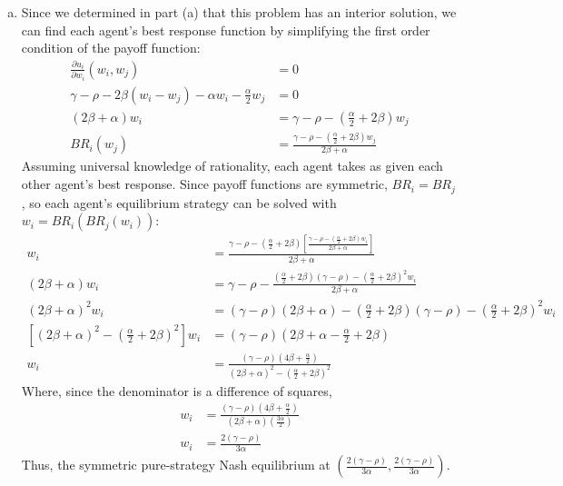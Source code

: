 \documentclass{article}
\begin{document}
\begin{enumerate}[(a)]
	\item Since we determined in part (a) that this problem has an interior solution, we can find each agent's best response function by simplifying the first order condition of the payoff function:
		\begin{align*}
			\frac{\partial u_i}{\partial w_i}(w_i,w_j) &= 0						\\
			\gamma-\rho-2\beta(w_i-w_j)-\alpha w_i - \frac{\alpha}{2}w_j &= 0	\\
			(2\beta+\alpha)w_i &= \gamma-\rho- \left(\frac{\alpha}{2} + 2\beta\right) w_j	\\
			BR_i(w_j) &= \frac{\gamma-\rho- \left(\frac{\alpha}{2} + 2\beta\right)w_j}{2\beta+\alpha}
		\end{align*}
		Assuming universal knowledge of rationality, each agent takes as given each other agent's best response. Since payoff functions are symmetric, ${BR_i=BR_j}$, so each agent's equilibrium strategy can be solved with ${w_i = BR_i\left(BR_j(w_i)\right)}$:
		\begin{align*}
			w_i &= \frac{ \gamma-\rho- \left(\frac{\alpha}{2} + 2\beta\right)\left[\frac{ \gamma-\rho- \left(\frac{\alpha}{2}+ 2\beta\right)w_i}{2\beta+\alpha}\right]}{2\beta+\alpha} \\
			(2\beta+\alpha)w_i &= \gamma-\rho-\frac{ \left(\frac{\alpha}{2} + 2\beta\right)(\gamma-\rho)- \left(\frac{\alpha}{2} + 2\beta\right)^2w_i}{2\beta+\alpha}	\\
			(2\beta+\alpha)^2w_i &= (\gamma-\rho)(2\beta+\alpha)-\left(\frac{\alpha}{2} + 2\beta\right)(\gamma-\rho)- \left(\frac{\alpha}{2} + 2\beta\right)^2w_i	\\
			\left[(2\beta+\alpha)^2- \left(\frac{\alpha}{2} + 2\beta\right)^2\right]w_i &= (\gamma-\rho)\left(2\beta+\alpha-\frac{\alpha}{2} + 2\beta\right)	\\
			w_i &= \frac{(\gamma-\rho)\left(4\beta+\frac{\alpha}{2}\right)}{(2\beta+\alpha)^2- \left(\frac{\alpha}{2} + 2\beta\right)^2}
		\end{align*}
		Where, since the denominator is a difference of squares, 
		\begin{align*}
			w_i &= \frac{(\gamma-\rho)\left(4\beta+\frac{\alpha}{2}\right)}{\left(2\beta+\alpha\right)\left(\frac{3\alpha}{2}\right)}	\\
			w_i &= \frac{2(\gamma-\rho)}{3\alpha}
		\end{align*}
		Thus, the symmetric pure-strategy Nash equilibrium at ${\left(\frac{2(\gamma-\rho)}{3\alpha},\frac{2(\gamma-\rho)}{3\alpha}\right)}$.
		

\end{enumerate}
\end{document}
